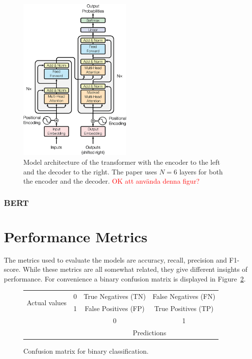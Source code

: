 \begin{figure}[H]
    \centering
    \includegraphics[width=0.5\textwidth]{Figures/The-Transformer-model-architecture.png}
    \caption{Model architecture of the transformer with the encoder to the left and the decoder to the right. The paper uses $N = 6$ layers for both the encoder and the decoder. \textcolor{red}{OK att använda denna figur?}}
    \label{fig:tr_arch}
\end{figure}









\subsubsection{BERT}




\section{Performance Metrics}
The metrics used to evaluate the models are accuracy, recall, precision and F1-score. While these metrics are all somewhat related, they give different insights of performance. For convenience a binary confusion matrix is displayed in Figure~\ref{fig:confmat}. 

\begin{figure}[h]
\centering
\begin{tabular}{cccc}
     \multirow{2}{*}{Actual values} & 0 & \multicolumn{1}{|c|}{True Negatives (TN)} &  \multicolumn{1}{c|}{False Negatives (FN)} \\
     \cline{2-4}
      & 1 & \multicolumn{1}{|c|}{False Positives (FP)} & \multicolumn{1}{c|}{True Positives (TP)} \\ 
      \cline{2-4}
     & & \multicolumn{1}{|c|}{0} & \multicolumn{1}{c|}{1}\\
     
     & & \multicolumn{2}{c}{Predictions} \\
\end{tabular}
\caption{Confusion matrix for binary classification.}
\label{fig:confmat}
\end{figure}

